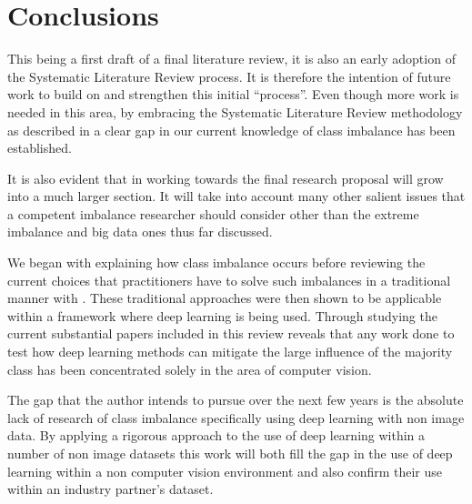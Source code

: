 \section{Conclusions}


This being a first draft of a final literature review, it is also an early adoption of the Systematic Literature Review process. It is therefore the intention of future work to build on and strengthen this initial ``process''. Even though more work is needed in this area, by embracing the Systematic Literature Review methodology as described in  a clear gap in our current knowledge of class imbalance has been established.
\par
It is also evident that in working towards the final research proposal  will grow into a much larger section. It will take into account many other salient issues that a competent imbalance researcher should consider other than the extreme imbalance and big data ones thus far discussed.
\par
We began with  explaining how class imbalance occurs before reviewing the current choices that practitioners have to solve such imbalances in a traditional manner with . These traditional approaches were then shown to be applicable within a framework where deep learning is being used. 
Through studying the current substantial papers included in  this review reveals that any work done to test how deep learning methods can mitigate the large influence of the majority class has been concentrated solely in the area of computer vision. 
\par
The gap that the author intends to pursue over the next few years is the absolute lack of research of class imbalance specifically using deep learning with non image data. By applying a rigorous approach to the use of deep learning within a number of non image datasets this work will both fill the gap in the use of deep learning within a non computer vision environment and also confirm their use within an industry partner's dataset.




